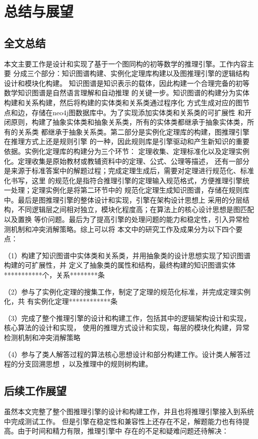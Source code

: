 \documentclass{standalone}
\begin{document}
	
\chapter{总结与展望}
\section{全文总结}
本文主要工作是设计和实现了基于一个图同构的初等数学的推理引擎。工作内容主要
分成三个部分：知识图谱构建、实例化定理库构建以及图推理引擎的逻辑结构设计和模块化构建。
知识图谱是知识表示的载体，因此构建一个合理完备的初等数学知识图谱是自然语言理解和自动推理
的关键一步。知识图谱的构建分为实体构建和关系构建，然后将构建的实体类和关系类通过程序化
方式生成对应的图节点和边，存储在neo4j图数据库中。为了实现添加实体类和关系类的可扩展性
和开闭原则，构建了抽象实体类和抽象关系类，所有的实体类都继承于抽象实体类，所有的关系类
都继承于抽象关系类。第二部分是实例化定理库的构建，图推理引擎在推理方式上还是规则引擎
的一种，因此规则库是引擎驱动和产生新知识的重要依据。实例化定理库的构建分为三个环节：
定理收集、定理标准化以及定理实例化。定理收集是原始教材或教辅资料中的定理、公式、公理等描述，
还有一部分是来源于标准答案中的解题过程；完成定理生成后，需要对定理进行规范化、标准化书写，这里
的规范化是指符合推理引擎的定理输入规范格式，方便推理引擎统一处理；定理实例化是将第二环节中的
规范化定理生成知识图谱，存储在规则库中。最后是图推理引擎的整体设计和实现，引擎在架构设计思想上
采用的分层结构，不同逻辑层之间相对独立，模块化程度高；在算法上的核心设计思想是图匹配以及置换
等价问题。最后为了提高引擎的处理问题的能力和稳定性，引入异常检测机制和冲突消解策略。综上可以将
本文中的研究工作及成果分为以下四个要点：

（1）构建了知识图谱中实体类和关系类，并用抽象类的设计思想实现了知识图谱构建的可扩展性，并
定义了抽象类的属性和结构，最终构建的知识图谱实体***********个，关系********条

（2）参与了实例化定理的搜集工作，制定了定理的规范化标准，并完成定理实例化，共
有实例化定理************条

（3）完成了整个推理引擎的设计和构建工作，包括其中的逻辑架构设计和实现，核心算法的设计和实现，
使用的推理方式设计和实现，每层的模块化构建，异常检测机制和冲突消解策略

（4）参与了类人解答过程的算法核心思想设计和部分构建工作。设计类人解答过程的分支回溯思想
，以及推理中的规则树构建。

\section{后续工作展望}
虽然本文完整了整个图推理引擎的设计和构建工作，并且也将推理引擎接入到系统中完成测试工作。
但是引擎在稳定性和兼容性上还存在不足，解题能力也有待提高。由于时间和精力有限，推理引擎中
存在的不足和疑难问题还待解决：
\end{document}
